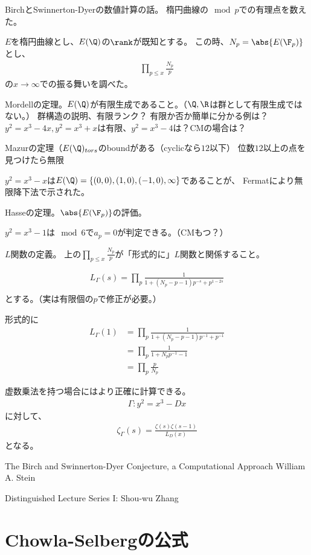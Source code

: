 \documentclass[uplatex, a4paper]{jsbook}
\begin{document}
BirchとSwinnerton-Dyerの数値計算の話。
楕円曲線の$\mod p$での有理点を数えた。

$E$を楕円曲線とし、$E(\Q)$の$\rank$が既知とする。
この時、$N_p=\abs{E(\F_p)}$とし、
\begin{align*}
\prod_{p\leq x}\frac{N_p}{p}
\end{align*}
の$x \to \infty$での振る舞いを調べた。

Mordellの定理。$E(\Q)$が有限生成であること。（$\Q, \R$は群として有限生成ではない。）
群構造の説明、有限ランク？
有限か否か簡単に分かる例は？
$y^2=x^3-4x, y^2=x^3+x$は有限、$y^2=x^3-4$は？CMの場合は？

Mazurの定理（$E(\Q)_{tors}$のboundがある（cyclicなら$12$以下）
位数$12$以上の点を見つけたら無限

$y^2=x^3-x$は$E(\Q)=\{(0,0), (1,0), (-1,0), \infty\}$であることが、
Fermatにより無限降下法で示された。

Hasseの定理。$\abs{E(\F_p)}$の評価。

$y^2=x^3-1$は$\mod 6$で$a_p=0$が判定できる。（CMもつ？）

$L$関数の定義。
上の$\prod_{p\leq x}\frac{N_p}{p}$が「形式的に」$L$関数と関係すること。

\begin{align*}
L_\Gamma(s)=\prod_p\frac{1}{1+(N_p-p-1)p^{-s}+p^{1-2s}}\\
\end{align*}
とする。（実は有限個の$p$で修正が必要。）

形式的に
\begin{align*}
L_\Gamma(1)&=\prod_p\frac{1}{1+(N_p-p-1)p^{-1}+p^{-1}}\\
&=\prod_p\frac{1}{1+N_pp^{-1}-1}\\
&=\prod_p\frac{p}{N_p}
\end{align*}


虚数乗法を持つ場合にはより正確に計算できる。
\begin{align*}
\Gamma:y^2=x^3-Dx
\end{align*}
に対して、
\begin{align*}
\zeta_{\Gamma}(s)=\frac{\zeta(s)\zeta(s-1)}{L_D(x)}
\end{align*}
となる。

The Birch and Swinnerton-Dyer Conjecture, a Computational Approach
William A. Stein

Distinguished Lecture Series I: Shou-wu Zhang

\chapter{Chowla-Selbergの公式}
\end{document}

